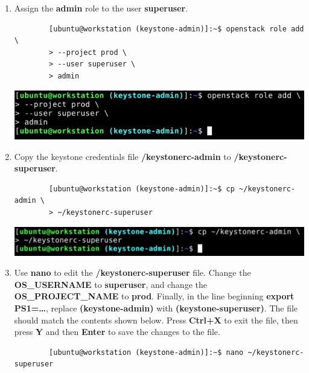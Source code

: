 \documentclass[letterpaper, 12pt]{article}
\begin{document}
\begin{enumerate}
    \item Assign the \textbf{admin} role to the user \textbf{superuser}.
    \begin{lstlisting}
        [ubuntu@workstation (keystone-admin)]:~$ openstack role add \
        > --project prod \
        > --user superuser \
        > admin
    \end{lstlisting}

    \begin{center}
        \includegraphics[width=\linewidth]{images/part1/step6.png}
    \end{center}

    \item Copy the keystone credentials file \textbf{\texttildemid/keystonerc-admin} to
    \textbf{\texttildemid/keystonerc-superuser}.
    \begin{lstlisting}
        [ubuntu@workstation (keystone-admin)]:~$ cp ~/keystonerc-admin \
        > ~/keystonerc-superuser
    \end{lstlisting}

    \begin{center}
        \includegraphics[width=\linewidth]{images/part1/step7.png}
    \end{center}

    \item Use \textbf{nano} to edit the \textbf{\texttildemid/keystonerc-superuser} file.
    Change the \textbf{OS\_USERNAME} to \textbf{superuser}, and change the \textbf{OS\_PROJECT\_NAME} to \textbf{prod}.
    Finally, in the line beginning \textbf{export PS1=…}, replace \textbf{(keystone-admin)} with \textbf{(keystone-superuser)}.
    The file should match the contents shown below.
    Press \textbf{Ctrl+X} to exit the file, then press \textbf{Y} and then \textbf{Enter} to save the changes to the file.
    \begin{lstlisting}
        [ubuntu@workstation (keystone-admin)]:~$ nano ~/keystonerc-superuser
    \end{lstlisting}


\end{enumerate}
\end{document}
